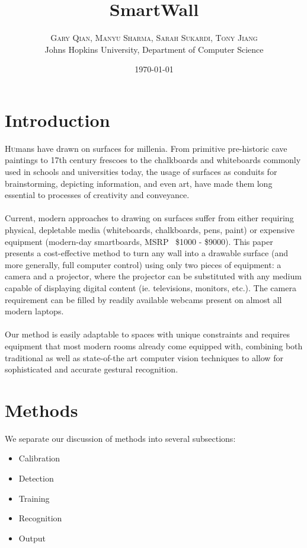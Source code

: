 \documentclass[twoside,twocolumn]{article}
\title{SmartWall} %
\author{%
\textsc{Gary Qian, Manyu Sharma, Sarah Sukardi, Tony Jiang}\\[1ex] %
\normalsize Johns Hopkins University, Department of Computer Science \\ %
}
\date{\today} %
\begin{document}
\maketitle


\section{Introduction}

\lettrine[nindent=0em,lines=3]{H} umans have drawn on surfaces for millenia. From primitive pre-historic cave paintings to 17th century frescoes to the chalkboards and whiteboards commonly used in schools and universities today, the usage of surfaces as conduits for brainstorming, depicting information, and even art, have made them long essential to processes of creativity and conveyance.\\ \\Current, modern approaches to drawing on surfaces suffer from either requiring physical, depletable media (whiteboards, chalkboards, pens, paint) or expensive equipment (modern-day smartboards, MSRP ~\$1000 - \$9000). This paper presents a cost-effective method to turn any wall into a drawable surface (and more generally, full computer control) using only two pieces of equipment: a camera and a projector, where the projector can be substituted with any medium capable of displaying digital content (ie. televisions, monitors, etc.). The camera requirement can be filled by readily available webcams present on almost all modern laptops.\\ \\ Our method is easily adaptable to spaces with unique constraints and requires equipment that most modern rooms already come equipped with, combining both traditional as well as state-of-the art computer vision techniques to allow for sophisticated and accurate gestural recognition.
\section{Methods}

We separate our discussion of methods into several subsections:
\begin{itemize}
\item Calibration
\item Detection
\item Training
\item Recognition
\item Output
\end{itemize}
\end{document}
